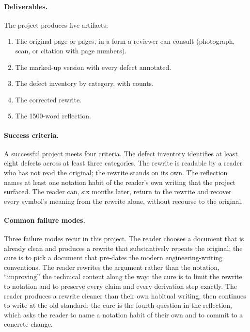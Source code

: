 \begin{project}
\paragraph{Deliverables.}
The project produces five artifacts:
\begin{enumerate}[leftmargin=*]
  \item The original page or pages, in a form a reviewer can
    consult (photograph, scan, or citation with page numbers).
  \item The marked-up version with every defect annotated.
  \item The defect inventory by category, with counts.
  \item The corrected rewrite.
  \item The 1500-word reflection.
\end{enumerate}

\paragraph{Success criteria.}
A successful project meets four criteria. The defect inventory
identifies at least eight defects across at least three categories.
The rewrite is readable by a reader who has not read the original;
the rewrite stands on its own. The reflection names at least one
notation habit of the reader's own writing that the project
surfaced. The reader can, six months later, return to the rewrite
and recover every symbol's meaning from the rewrite alone, without
recourse to the original.

\paragraph{Common failure modes.}
Three failure modes recur in this project. The reader chooses a
document that is already clean and produces a rewrite that
substantively repeats the original; the cure is to pick a document
that pre-dates the modern engineering-writing conventions.
The reader rewrites the argument rather than the notation,
``improving'' the technical content along the way; the cure is to
limit the rewrite to notation and to preserve every claim and every
derivation step exactly. The reader produces a rewrite cleaner than
their own habitual writing, then continues to write at the old
standard; the cure is the fourth question in the reflection, which
asks the reader to name a notation habit of their own and to
commit to a concrete change.
\end{project}

